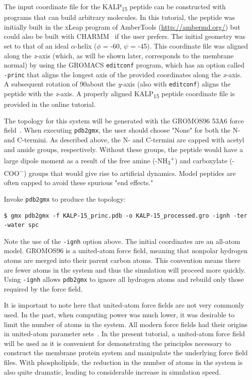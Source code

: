 \documentclass[9pt,tutorial,pubversion]{livecoms}
\begin{document}
The input coordinate file for the KALP\textsubscript{15} peptide can be constructed with programs that can build arbitrary molecules. In this tutorial, the peptide was initially built in the xLeap program of AmberTools (\url{http://ambermd.org/}) but could also be built with CHARMM~\cite{Brooks2009} if the user prefers. The initial geometry was set to that of an ideal $\alpha$-helix ($\phi$ = -60\textdegree, $\psi$ = -45\textdegree). This coordinate file was aligned along the {\em z}-axis (which, as will be shown later, corresponds to the membrane normal) by using the GROMACS \texttt{editconf} program, which has an option called \texttt{-princ} that aligns the longest axis of the provided coordinates along the {\em x}-axis. A subsequent rotation of 90\textdegree about the {\em y}-axis (also with \texttt{editconf}) aligns the peptide with the {\em z}-axis. A properly aligned KALP\textsubscript{15} peptide coordinate file is provided in the online tutorial.

The topology for this system will be generated with the GROMOS96 53A6 force field~\cite{Oostenbrink2004}. When executing \texttt{pdb2gmx}, the user should choose "None" for both the N- and C-termini. As described above, the N- and C-termini are capped with acetyl and amide groups, respectively. Without these groups, the peptide would have a large dipole moment as a result of the free amine (-NH\textsubscript{3}\textsuperscript{+}) and carboxylate (-COO\textsuperscript{$-$}) groups that would give rise to artificial dynamics. Model peptides are often capped to avoid these spurious "end effects."

Invoke \texttt{pdb2gmx} to produce the topology:

\begin{lstlisting}
$ gmx pdb2gmx -f KALP-15_princ.pdb -o KALP-15_processed.gro -ignh -ter -water spc
\end{lstlisting}

Note the use of the \texttt{-ignh} option above. The initial coordinates are an all-atom model. GROMOS96 is a united-atom force field, meaning that nonpolar hydrogen atoms are merged into their parent carbon atoms. This convention means there are fewer atoms in the system and thus the simulation will proceed more quickly. Using \texttt{-ignh} allows \texttt{pdb2gmx} to ignore all hydrogen atoms and rebuild only those required by the force field.

It is important to note here that united-atom force fields are not very commonly used. In the past, when computing power was much lower, it was desirable to limit the number of atoms in the system. All modern force fields had their origins in united-atom parameter sets~\cite{Gelin1979,Weiner1984,Jorgensen1984}. In the present tutorial, a united-atom force field will be used as it is convenient for demonstrating the principles necessary to construct the membrane protein system and manipulate the underlying force field files. With phospholipids, the reduction in the number of atoms in the system is also quite dramatic, leading to considerable increase in simulation speed.
\end{document}
